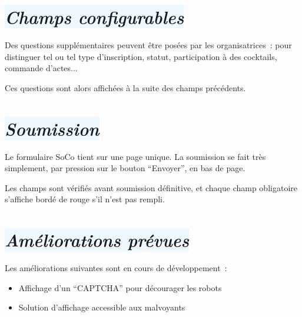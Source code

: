 \documentclass[10pt,a4paper]{article}
\newcommand{\bleupale}[1]{\colorbox{AliceBlue}{#1}}
\begin{document}
\section*{\bleupale{\emph{Champs configurables}}}

Des questions supplémentaires peuvent être posées par les organisatrices : pour distinguer tel ou tel type d'inscription, statut, participation à des cocktails, commande d'actes...

Ces questions sont alors affichées à la suite des champs précédents.

\section*{\bleupale{\emph{Soumission}}}

Le formulaire SoCo tient sur une page unique. La soumission se fait très simplement, par pression sur le bouton ``Envoyer'', en bas de page.

Les champs sont vérifiés avant soumission définitive, et chaque champ obligatoire s'affiche bordé de rouge s'il n'est pas rempli.

\section*{\bleupale{\emph{Améliorations prévues}}}

Les améliorations suivantes sont en cours de développement :

\begin{itemize}
  \item Affichage d'un ``CAPTCHA'' pour décourager les robots
  \item Solution d'affichage accessible aux malvoyants
\end{itemize}

\hfill

\end{document}
